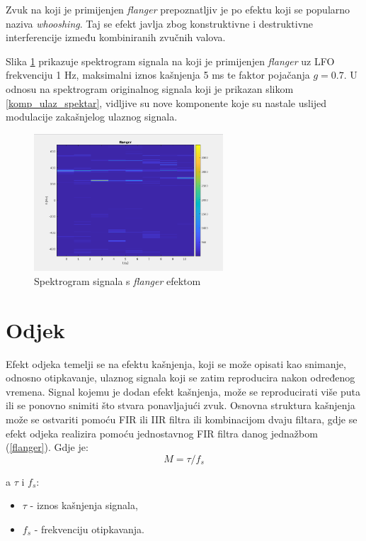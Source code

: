 \documentclass[conference]{IEEEtran}
\begin{document}
Zvuk na koji je primijenjen \textit{flanger} prepoznatljiv je po efektu koji se popularno naziva
\textit{whooshing}. Taj se efekt javlja zbog konstruktivne i destruktivne interferencije između kombiniranih
zvučnih valova.

Slika \ref{flang_spektar} prikazuje spektrogram signala na koji je primijenjen \textit{flanger} uz LFO
frekvenciju 1 Hz, maksimalni iznos kašnjenja 5 ms te faktor pojačanja $g=0.7$. U odnosu na spektrogram originalnog
signala koji je prikazan slikom \ref{komp_ulaz_spektar}, vidljive su nove komponente koje su nastale uslijed
modulacije zakašnjelog ulaznog signala.

\begin{figure}[H]
    \includegraphics[width=200pt]{slike/flanger_spektar.png}
    \centering
    \caption{Spektrogram signala s \textit{flanger} efektom}
    \label{flang_spektar}
\end{figure}

\section{Odjek}

Efekt odjeka temelji se na efektu kašnjenja, koji se može opisati kao snimanje, odnosno otipkavanje, ulaznog signala
koji se zatim reproducira nakon određenog vremena. Signal kojemu je dodan efekt kašnjenja, može se
reproducirati više puta ili se ponovno snimiti što stvara ponavljajući zvuk. Osnovna struktura kašnjenja može
se ostvariti pomoću FIR ili IIR filtra ili kombinacijom dvaju filtara, gdje se efekt odjeka realizira pomoću
jednostavnog FIR filtra danog jednažbom (\ref{flanger}).
Gdje je:
\begin{equation}
  M = \tau/f_{s}
  \label{M}
\end{equation}

a $\tau$ i $f_{s}$:
 \begin{itemize}
   \item{$\tau$ - iznos kašnjenja signala,}
   \item{$f_{s}$ - frekvenciju otipkavanja.}
 \end{itemize}
\end{document}

